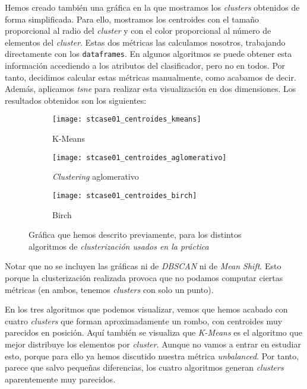 \documentclass[11pt]{article}
\begin{document}
Hemos creado también una gráfica en la que mostramos los \emph{clusters} obtenidos de forma simplificada. Para ello, mostramos los centroides con el tamaño proporcional al radio del \emph{cluster} y con el color proporcional al número de elementos del \emph{cluster}. Estas dos métricas las calculamos nosotros, trabajando directamente con los \lstinline{dataframes}. En algunos algoritmos se puede obtener esta información accediendo a los atributos del clasificador, pero no en todos. Por tanto, decidimos calcular estas métricas manualmente, como acabamos de decir. Además, aplicamos \emph{tsne} para realizar esta visualización en dos dimensiones. Los resultados obtenidos son los siguientes:

\begin{figure}[H]
    \centering

    \begin{subfigure}[b]{0.45 \textwidth}
        \texttt{[image: stcase01\_centroides\_kmeans]}
        \caption{K-Means}
    \end{subfigure}
    \begin{subfigure}[b]{0.45 \textwidth}
        \texttt{[image: stcase01\_centroides\_aglomerativo]}
        \caption{\emph{Clustering} aglomerativo}
    \end{subfigure}

    \begin{subfigure}[b]{0.45 \textwidth}
        \texttt{[image: stcase01\_centroides\_birch]}
        \caption{Birch}
    \end{subfigure}

        \caption{Gráfica que hemos descrito previamente, para los distintos algoritmos de \emph{clusterización usados en la práctica}}
\end{figure}

Notar que no se incluyen las gráficas ni de \emph{DBSCAN} ni de \emph{Mean Shift}. Esto porque la clusterización realizada provoca que no podamos computar ciertas métricas (en ambos, tenemos \emph{clusters} con solo un punto).

En los tres algoritmos que podemos visualizar, vemos que hemos acabado con cuatro \emph{clusters} que forman aproximadamente un rombo, con centroides muy parecidos en posición. Aquí también se visualiza que \emph{K-Means} es el algoritmo que mejor distribuye los elementos por \emph{cluster}. Aunque no vamos a entrar en estudiar esto, porque para ello ya hemos discutido nuestra métrica \emph{unbalanced}. Por tanto, parece que salvo pequeñas diferencias, los cuatro algoritmos generan \emph{clusters} aparentemente muy parecidos.
\end{document}
